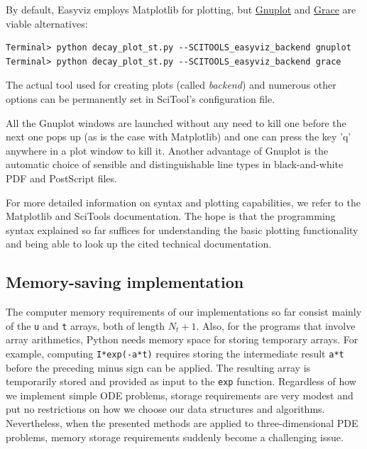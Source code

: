 \documentclass[%
oneside,                 %
final,                   %
10pt]{article}
\begin{document}
By default, Easyviz employs Matplotlib for plotting, but \href{{http://www.gnuplot.info/}}{Gnuplot} and \href{{http://plasma-gate.weizmann.ac.il/Grace/}}{Grace} are viable alternatives:

\begin{Verbatim}[frame=lines,label=\fbox{{\tiny Terminal}},framesep=2.5mm,framerule=0.7pt,fontsize=\fontsize{9pt}{9pt}]
Terminal> python decay_plot_st.py --SCITOOLS_easyviz_backend gnuplot
Terminal> python decay_plot_st.py --SCITOOLS_easyviz_backend grace
\end{Verbatim}
The actual tool used for creating plots (called \emph{backend})
and numerous other options
can be permanently set in SciTool's configuration file.

All the Gnuplot windows are launched without any need to kill one before
the next one pops up (as is the case with Matplotlib) and one can
press the key 'q' anywhere in a plot window to kill it.
Another advantage of Gnuplot is the automatic choice of sensible
and distinguishable line types in black-and-white PDF and PostScript
files.

For more detailed information on syntax and plotting capabilities,
we refer to the Matplotlib \cite{Matplotlib:doc}
and SciTools \cite{SciTools:doc} documentation.
The hope is that
the programming syntax explained so far suffices for understanding the
basic plotting functionality and being able to look up
the cited technical documentation.




\subsection{Memory-saving implementation}

The computer memory requirements of our implementations so far consist
mainly of the \texttt{u} and \texttt{t} arrays, both of length $N_t+1$.  Also, for
the programs that involve array arithmetics, Python needs memory space
for storing temporary arrays. For example, computing \texttt{I*exp(-a*t)}
requires storing the intermediate result \texttt{a*t} before the preceding
minus sign can be applied. The resulting array is temporarily stored
and provided as input to the \texttt{exp} function.  Regardless of how we
implement simple ODE problems, storage requirements are very modest
and put no restrictions on how we choose our data structures and
algorithms.  Nevertheless, when the presented methods are applied to
three-dimensional PDE problems, memory storage requirements suddenly
become a challenging issue.
\end{document}
